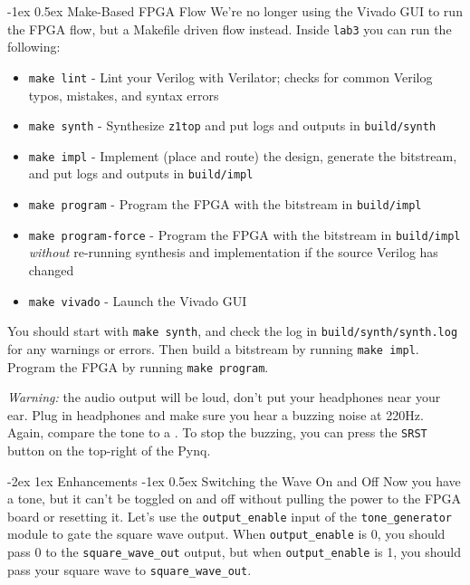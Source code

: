 \documentclass[11pt]{article}
\makeatletter
\renewcommand{\section}
{\@startsection {section}{1}{0pt}
 {-2ex}
 {1ex}
 {\bfseries\Large}}
\renewcommand{\subsection}
{\@startsection {subsection}{1}{0pt}
 {-1ex}
 {0.5ex}
 {\bfseries\normalsize}}
\makeatother
\begin{document}
\subsection{Make-Based FPGA Flow}
We're no longer using the Vivado GUI to run the FPGA flow, but a Makefile driven flow instead.
Inside \verb|lab3| you can run the following:
\begin{itemize}
  \item \verb|make lint| - Lint your Verilog with Verilator; checks for common Verilog typos, mistakes, and syntax errors
  \item \verb|make synth| - Synthesize \verb|z1top| and put logs and outputs in \verb|build/synth|
  \item \verb|make impl| - Implement (place and route) the design, generate the bitstream, and put logs and outputs in \verb|build/impl|
  \item \verb|make program| - Program the FPGA with the bitstream in \verb|build/impl|
  \item \verb|make program-force| - Program the FPGA with the bitstream in \verb|build/impl| \textit{without} re-running synthesis and implementation if the source Verilog has changed
  \item \verb|make vivado| - Launch the Vivado GUI
\end{itemize}

You should start with \verb|make synth|, and check the log in \texttt{build/synth/synth.log} for any warnings or errors.
Then build a bitstream by running \verb|make impl|.
Program the FPGA by running \texttt{make program}.

\textit{Warning:} the audio output will be loud, don't put your headphones near your ear.
Plug in headphones and make sure you hear a buzzing noise at 220Hz.
Again, compare the tone to a \href{https://www.szynalski.com/tone-generator/}{\color{blue}{reference tone generator}}.
To stop the buzzing, you can press the \verb|SRST| button on the top-right of the Pynq.

\section{Enhancements}
\subsection{Switching the Wave On and Off}
Now you have a tone, but it can't be toggled on and off without pulling the power to the FPGA board or resetting it.
Let's use the \verb|output_enable| input of the \verb|tone_generator| module to gate the square wave output.
When \verb|output_enable| is 0, you should pass 0 to the \verb|square_wave_out| output, but when \verb|output_enable| is 1, you should pass your square wave to \verb|square_wave_out|.
\end{document}
